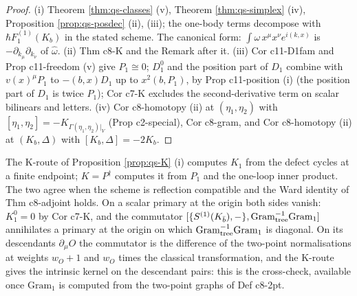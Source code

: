 \begin{proof}
(i) Theorem \ref{thm:qs-classes} (v), Theorem \ref{thm:qs-simplex} (iv), Proposition \ref{prop:qs-posdec} (ii), (iii); the one-body terms decompose with $\hbar F_1^{(1)}(K_b)$ in the stated scheme. The canonical form: $\int\omega\,x^\mu x^\nu e^{i(k,x)}$ is $-\partial_{k_\mu}\partial_{k_\nu}$ of $\hat\omega$. (ii) Thm c8-K and the Remark after it. (iii) Cor c11-D1fam and Prop c11-freedom (v) give $P_1\cong0$; $D^0_1$ and the position part of $D_1$ combine with $v(x)^\mu P_1$ to $-(b,x)D_1$ up to $x^2(b,P_1)$, by Prop c11-position (i) (the position part of $D_1$ is twice $P_1$); Cor c7-K excludes the second-derivative term on scalar bilinears and letters. (iv) Cor c8-homotopy (ii) at $(\eta_1,\eta_2)$ with $[\eta_1,\eta_2]=-K_{\Gamma(\eta_1,\eta_2)|_V}$ (Prop c2-special), Cor c8-gram, and Cor c8-homotopy (ii) at $(K_b,\Delta)$ with $[K_b,\Delta]=-2K_b$.
\end{proof}

\begin{remark}[The K-route and $K=P^\dagger$]
\label{rem:qs-KP}
The K-route of Proposition \ref{prop:qs-K} (i) computes $K_1$ from the defect cycles at a finite endpoint; $K=P^\dagger$ computes it from $P_1$ and the one-loop inner product. The two agree when the scheme is reflection compatible and the Ward identity of Thm c8-adjoint holds. On a scalar primary at the origin both sides vanish: $K^0_1=0$ by Cor c7-K, and the commutator $[\{S^{(1)}(K_{\bar b}),-\},\mathrm{Gram}_{\rm tree}^{-1}\mathrm{Gram}_1]$ annihilates a primary at the origin on which $\mathrm{Gram}_{\rm tree}^{-1}\mathrm{Gram}_1$ is diagonal. On its descendants $\partial_\mu O$ the commutator is the difference of the two-point normalisations at weights $w_O+1$ and $w_O$ times the classical transformation, and the K-route gives the intrinsic kernel on the descendant pairs: this is the cross-check, available once $\mathrm{Gram}_1$ is computed from the two-point graphs of Def c8-2pt.
\end{remark}
